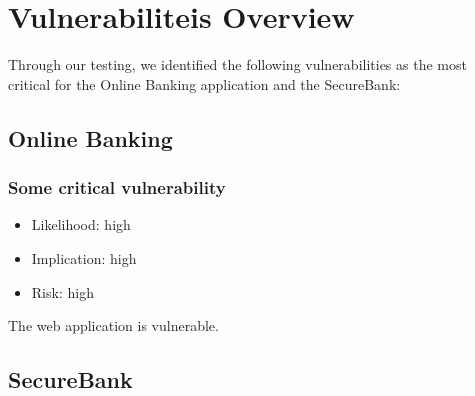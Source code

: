 \chapter{Vulnerabiliteis Overview}\label{chapter:vulnerabilies}

Through our testing, we identified the following vulnerabilities as the most critical for the Online Banking application and the SecureBank:

\section{Online Banking}
\subsection{Some critical vulnerability}
\begin{itemize}
	\item Likelihood: high
	\item Implication: high
	\item Risk: high
\end{itemize}

The web application is vulnerable.

\section{SecureBank}
